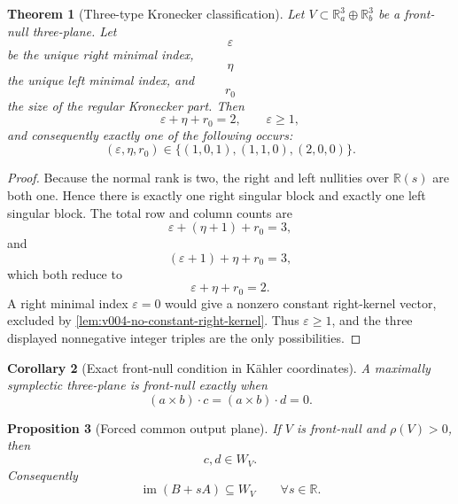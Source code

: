 \documentclass[10pt]{article}
\newtheorem{theorem}{Theorem}[section]
\newtheorem{proposition}[theorem]{Proposition}
\newtheorem{corollary}[theorem]{Corollary}
\newcommand{\R}{\mathbb R}
\begin{document}
\begin{theorem}[Three-type Kronecker classification]
\label{thm:v004-three-types}
Let \(V\subset\R_a^3\oplus\R_b^3\) be a front-null three-plane.  Let
\[
\varepsilon
\]
be the unique right minimal index,
\[
\eta
\]
the unique left minimal index, and
\[
r_0
\]
the size of the regular Kronecker part.  Then
\begin{equation}
\label{eq:v004-index-sum}
\boxed{
\varepsilon+\eta+r_0=2,
\qquad
\varepsilon\ge1,
}
\end{equation}
and consequently exactly one of the following occurs:
\begin{equation}
\label{eq:v004-three-types}
\boxed{
(\varepsilon,\eta,r_0)
\in
\{(1,0,1),(1,1,0),(2,0,0)\}.
}
\end{equation}
\end{theorem}

\begin{proof}
Because the normal rank is two, the right and left nullities over \(\R(s)\) are both one.  Hence
there is exactly one right singular block and exactly one left singular block.  The total row and
column counts are
\[
\varepsilon+(\eta+1)+r_0=3,
\]
and
\[
(\varepsilon+1)+\eta+r_0=3,
\]
which both reduce to
\[
\varepsilon+\eta+r_0=2.
\]
A right minimal index \(\varepsilon=0\) would give a nonzero constant right-kernel vector, excluded
by \cref{lem:v004-no-constant-right-kernel}.  Thus \(\varepsilon\ge1\), and the three displayed
nonnegative integer triples are the only possibilities.
\end{proof}

\begin{corollary}[Exact front-null condition in K\"ahler coordinates]
\label{cor:v005-null-condition}
A maximally symplectic three-plane is front-null exactly when
\begin{equation}
\label{eq:v005-null-condition}
\boxed{
(a\times b)\cdot c
=
(a\times b)\cdot d
=
0.
}
\end{equation}
\end{corollary}

\begin{proposition}[Forced common output plane]
\label{prop:v005-forced-output-plane}
If \(V\) is front-null and \(\rho(V)>0\), then
\begin{equation}
\label{eq:v005-cd-in-W}
\boxed{
c,d\in W_V.
}
\end{equation}
Consequently
\begin{equation}
\label{eq:v005-image-in-W}
\boxed{
\operatorname{im}(B+sA)\subseteq W_V
\qquad
\forall s\in\R.
}
\end{equation}
\end{proposition}
\end{document}
